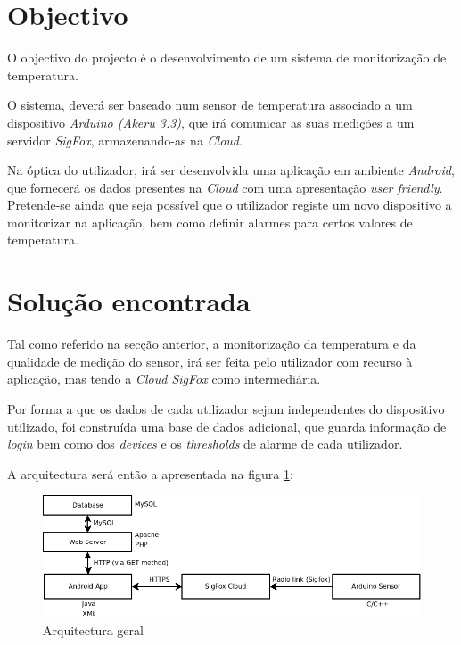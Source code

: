 \documentclass[a4paper]{article}
\begin{document}



\tableofcontents
{}
\pagebreak

\section{Objectivo}

O objectivo do projecto é o desenvolvimento de um sistema de monitorização de temperatura. 

O sistema, deverá ser baseado num sensor de temperatura associado a um dispositivo \textit{Arduino (Akeru 3.3)}, que irá comunicar as suas medições a um servidor \textit{SigFox}, armazenando-as na \textit{Cloud}.

Na óptica do utilizador, irá ser desenvolvida uma aplicação em ambiente \textit{Android}, que fornecerá os dados presentes na \textit{Cloud} com uma apresentação \textit{user friendly}. Pretende-se ainda que seja possível que o utilizador registe um novo dispositivo a monitorizar na aplicação, bem como definir alarmes para certos valores de temperatura.


\section{Solução encontrada}

Tal como referido na secção anterior, a monitorização da temperatura e da qualidade de medição do sensor, irá ser feita pelo utilizador com recurso à aplicação, mas tendo a \textit{Cloud SigFox} como intermediária.

Por forma a que os dados de cada utilizador sejam independentes do dispositivo utilizado, foi construída uma base de dados adicional, que guarda informação de \textit{login} bem como dos \textit{devices} e os \textit{thresholds} de alarme de cada utilizador.

A arquitectura será então a apresentada na figura \ref{fig:general}:
\vspace{2mm}

\begin{figure}[hb]
  \centering
  \includegraphics[scale=0.45]{general.png}
  \caption{Arquitectura geral}
  \label{fig:general}
\end{figure}
\end{document}
